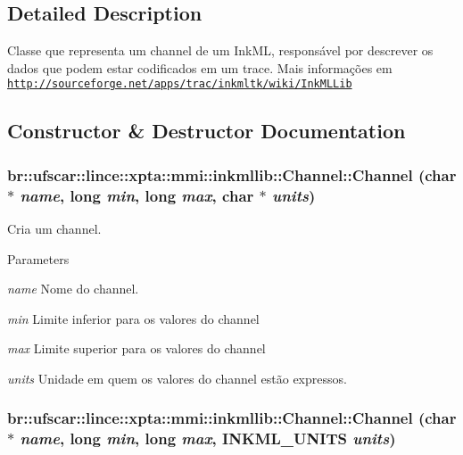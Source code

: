 \subsection{Detailed Description}
Classe que representa um channel de um InkML, responsável por descrever os dados que podem estar codificados em um trace. Mais informações em \href{http://sourceforge.net/apps/trac/inkmltk/wiki/InkMLLib}{\tt http://sourceforge.net/apps/trac/inkmltk/wiki/InkMLLib} 

\subsection{Constructor \& Destructor Documentation}
\hypertarget{classbr_1_1ufscar_1_1lince_1_1xpta_1_1mmi_1_1inkmllib_1_1Channel_a8caba3ff1f520d271fddce9dcc75f7a4}{
\subsubsection[{Channel}]{\setlength{\rightskip}{0pt plus 5cm}br::ufscar::lince::xpta::mmi::inkmllib::Channel::Channel (char $\ast$ {\em name}, \/  long {\em min}, \/  long {\em max}, \/  char $\ast$ {\em units})}}
\label{classbr_1_1ufscar_1_1lince_1_1xpta_1_1mmi_1_1inkmllib_1_1Channel_a8caba3ff1f520d271fddce9dcc75f7a4}


Cria um channel. 


\begin{DoxyParams}{Parameters}
\item[{\em name}]Nome do channel. \item[{\em min}]Limite inferior para os valores do channel \item[{\em max}]Limite superior para os valores do channel \item[{\em units}]Unidade em quem os valores do channel estão expressos. \end{DoxyParams}
\hypertarget{classbr_1_1ufscar_1_1lince_1_1xpta_1_1mmi_1_1inkmllib_1_1Channel_a779790d4eabe0735325b8eb5d9139fff}{
\subsubsection[{Channel}]{\setlength{\rightskip}{0pt plus 5cm}br::ufscar::lince::xpta::mmi::inkmllib::Channel::Channel (char $\ast$ {\em name}, \/  long {\em min}, \/  long {\em max}, \/  {\bf INKML\_\-UNITS} {\em units})}}
\label{classbr_1_1ufscar_1_1lince_1_1xpta_1_1mmi_1_1inkmllib_1_1Channel_a779790d4eabe0735325b8eb5d9139fff}


